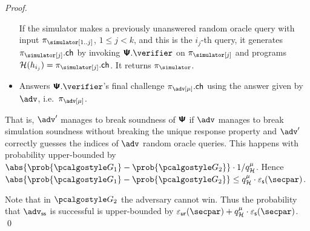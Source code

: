 \documentclass[runningheads,10pt]{llncs}
\begin{document}
\begin{proof}
\begin{itemize}
    If the simulator makes a previously unanswered random
    oracle query with input $\zkproof_\simulator[1..j]$, $1 \leq j < k$, and this is the $i_j$-th query, it generates $\zkproof_\simulator[j].\ch$ by
    invoking $\ps.\verifier$ on $\zkproof_\simulator[j]$ and programs
    $\ro(h_{i_j}) = \zkproof_\simulator[j].\ch$.
    It returns $\zkproof_\simulator$.
  \item Answers $\ps.\verifier$'s final challenge $\zkproof_\adv[\mu].\ch$ using the
    answer given by $\adv$, i.e.~$\zkproof_\adv[\mu]$.
  \end{itemize}
  That is, $\adv'$ manages to break soundness of $\bm{\mathsf{\Psi}}$ if $\adv$ manages to
  break simulation soundness without breaking the unique response property and
  $\adv'$ correctly guesses the indices of $\adv$ random oracle queries. This
  happens with probability upper-bounded by $\abs{\prob{\game{1}} -
    \prob{\game{2}}} \cdot \infrac{1}{q_\ro^{\mu}}$. Hence $\abs{\prob{\game{1}} -
    \prob{\game{2}}} \leq q_\ro^{\mu} \cdot \epss(\secpar)$.

  Note that in $\game{2}$ the adversary cannot win. Thus the probability
  that $\advss$ is successful is upper-bounded by
  $\epsur(\secpar) + q_{\ro}^{\mu} \cdot \epss(\secpar)$.  \qed
\end{proof}
\end{document}
